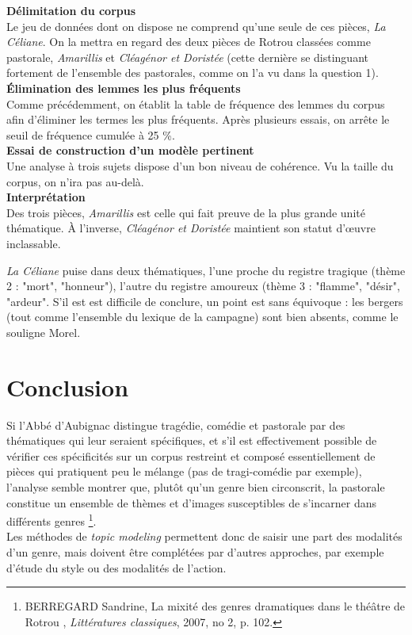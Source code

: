 \documentclass[a4paper,twoside,12pt]{article}
\begin{document}
\textbf{Délimitation du corpus}\\
Le jeu de données dont on dispose ne comprend qu'une seule de ces pièces, \textit{La Céliane}. On la mettra en regard des deux pièces de Rotrou classées comme pastorale, \textit{Amarillis} et \textit{Cléagénor et Doristée} (cette dernière se distinguant fortement de l'ensemble des pastorales, comme on l'a vu dans la question 1).\\

\textbf{Élimination des lemmes les plus fréquents}\\
Comme précédemment, on établit la table de fréquence des lemmes du corpus afin d'éliminer les termes les plus fréquents. Après plusieurs essais, on arrête le seuil de fréquence cumulée à 25 \%.\\

\textbf{Essai de construction d'un modèle pertinent}\\
Une analyse à trois sujets dispose d'un bon niveau de cohérence. Vu la taille du corpus, on n'ira pas au-delà.\\

\textbf{Interprétation}\\
Des trois pièces, \textit{Amarillis} est celle qui fait preuve de la plus grande unité thématique.
À l'inverse, \textit{Cléagénor et Doristée} maintient son statut d'œuvre inclassable.

\textit{La Céliane} puise dans deux thématiques, l'une proche du registre tragique (thème 2 : "mort", "honneur"), l'autre du registre amoureux (thème 3 : "flamme", "désir", "ardeur". S'il est est difficile de conclure, un point est sans équivoque : les bergers (tout comme l'ensemble du lexique de la campagne) sont bien absents, comme le souligne Morel.

\section*{Conclusion}
Si l'Abbé d'Aubignac distingue tragédie, comédie et pastorale par des thématiques qui leur seraient spécifiques, et s'il est effectivement possible de vérifier ces spécificités sur un corpus restreint et composé essentiellement de pièces qui pratiquent peu le mélange (pas de tragi-comédie par exemple), l'analyse semble montrer que, plutôt qu'un genre bien circonscrit, la pastorale constitue \og un ensemble de thèmes et d’images susceptibles de s’incarner dans différents genres \fg{}\footnote{BERREGARD Sandrine, \og La mixité des genres dramatiques dans le théâtre de Rotrou \fg{}, \textit{Littératures classiques}, 2007, no 2, p. 102.}.\\
Les méthodes de \textit{topic modeling} permettent donc de saisir une part des modalités d'un genre, mais doivent être complétées par d'autres approches, par exemple d'étude du style ou des modalités de l'action.
\end{document}
